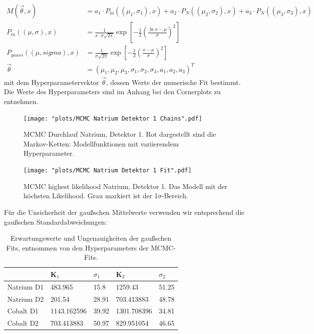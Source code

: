 \documentclass[%
aps,
onecolumn,
11pt,
tightenlines,
nofootinbib,
superscriptaddress,
floatfix,
prd,
]{revtex4-2}
\begin{document}
\begin{align}
	M(\vec{\theta}, x) &= a_1 \cdot P_{ln}((\mu_1,\sigma_1),x) + a_2 \cdot P_{N}((\mu_2,\sigma_2), x) + a_3 \cdot P_{N}((\mu_3,\sigma_3), x) \\
	P_{ln}((\mu,\sigma), x) &= \frac{1}{x \cdot \sigma \sqrt{2\pi}} \exp \left[ -\frac{1}{2} \left ( \frac{\ln x - \mu}{\sigma} \right )^2  \right] \\
    P_{gauss}((\mu,sigma), x) &= \frac{1}{\sigma \sqrt{2\pi}} \exp \left[ -\frac{1}{2} \left( \frac{x-\mu}{\sigma} \right)^2 \right ] \\
    \vec{\theta} &= (\mu_1, \mu_2, \mu_3, \sigma_1, \sigma_2, \sigma_3, a_1, a_2, a_3)^T
\end{align}
mit dem Hyperparametervektor $\vec\theta$, dessen Werte der numerische Fit bestimmt. Die Werte des Hyperparameters sind im Anhang bei den Cornerplots zu entnehmen. 
\begin{figure}[H]
	\centering
	\texttt{[image: "plots/MCMC Natrium Detektor 1 Chains".pdf]}
	\caption{MCMC Durchlauf Natrium, Detektor 1. Rot dargestellt sind die Markov-Ketten: Modellfunktionen mit variierendem Hyperparameter.}
\end{figure}

\begin{figure}[H]
	\centering
	\texttt{[image: "plots/MCMC Natrium Detektor 1 Fit".pdf]}
	\caption{MCMC highest likelihood Natrium, Detektor 1. Das Modell mit der höchsten Likelihood. Grau markiert ist der 1$\sigma$-Bereich.}
\end{figure}

Für die Unsicherheit der gaußschen Mittelwerte verwenden wir entsprechend die gaußschen Standardabweichungen:
\begin{table}[H]
    \centering
    \begin{tabular}{lllll}
    \hline
        		  & K$_1$ & $\sigma_1$ & K$_2$ & $\sigma_2$ \\ \hline
        Natrium D1 & 483.965 & 15.8 & 1259.43 & 51.25 \\ \hline
        Natrium D2 & 201.54 & 28.91 & 703.413883 & 48.78 \\ \hline
        Cobalt D1 & 1143.162596 & 39.92 & 1301.708396 & 34.81 \\ \hline
        Cobalt D2 & 703.413883 & 50.97 & 829.951054 & 46.65 \\ \hline
    \end{tabular}
	\caption{Erwartungswerte und Ungenauigkeiten der gaußschen Fits, entnommen von den Hyperparameters der MCMC-Fits.}
	\label{tab:mcmcerror}
\end{table}
\end{document}
